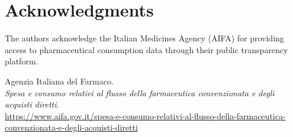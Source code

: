 \documentclass[10pt]{article}
\begin{document}
\newpage
\section*{Acknowledgments}
The authors acknowledge the Italian Medicines Agency (AIFA) for providing access to pharmaceutical consumption data through their public transparency platform.

\begin{thebibliography}{1}
 Agenzia Italiana del Farmaco.\\ \textit{Spesa e consumo relativi al flusso della farmaceutica convenzionata e degli acquisti diretti}.\\ \href{https://www.aifa.gov.it/spesa-e-consumo-relativi-al-flusso-della-farmaceutica-convenzionata-e-degli-acquisti-diretti} {https://www.aifa.gov.it/spesa\allowbreak-e\allowbreak-consumo\allowbreak-relativi\allowbreak-al\allowbreak-flusso\allowbreak-della\allowbreak-farmaceutica\allowbreak-convenzionata\allowbreak-e-degli\allowbreak-acquisti\allowbreak-diretti}

\end{thebibliography}
\end{document}
